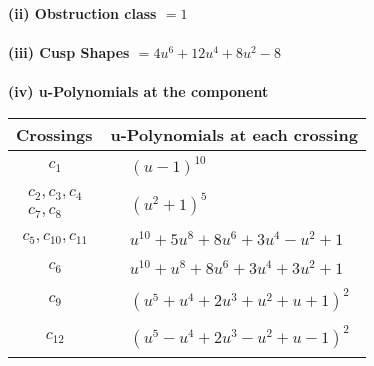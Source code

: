 \documentclass[1p]{elsarticle_modified}
\theoremstyle{definition}
\begin{document}
\flushleft \textbf{(ii) Obstruction class $= 1$}\\~\\
\flushleft \textbf{(iii) Cusp Shapes $= 4 u^6+12 u^4+8 u^2-8$}\\~\\
\newpage\renewcommand{\arraystretch}{1}
\flushleft \textbf{(iv) u-Polynomials at the component}\newline \\
\begin{tabular}{m{50pt}|m{274pt}}
Crossings & \hspace{64pt}u-Polynomials at each crossing \\
\hline $$\begin{aligned}c_{1}\end{aligned}$$&$\begin{aligned}
&(u-1)^{10}
\end{aligned}$\\
\hline $$\begin{aligned}c_{2},c_{3},c_{4}\\c_{7},c_{8}\end{aligned}$$&$\begin{aligned}
&(u^2+1)^5
\end{aligned}$\\
\hline $$\begin{aligned}c_{5},c_{10},c_{11}\end{aligned}$$&$\begin{aligned}
&u^{10}+5 u^8+8 u^6+3 u^4- u^2+1
\end{aligned}$\\
\hline $$\begin{aligned}c_{6}\end{aligned}$$&$\begin{aligned}
&u^{10}+u^8+8 u^6+3 u^4+3 u^2+1
\end{aligned}$\\
\hline $$\begin{aligned}c_{9}\end{aligned}$$&$\begin{aligned}
&(u^5+u^4+2 u^3+u^2+u+1)^2
\end{aligned}$\\
\hline $$\begin{aligned}c_{12}\end{aligned}$$&$\begin{aligned}
&(u^5- u^4+2 u^3- u^2+u-1)^2
\end{aligned}$\\
\hline
\end{tabular}\\~\\
\end{document}
